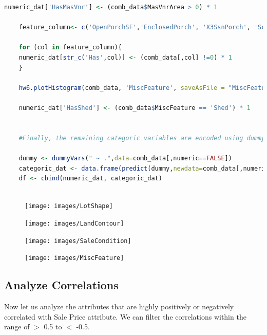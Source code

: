 \documentclass[sigconf]{acmart}
\begin{document}
\begin{lstlisting}[language=R]
	numeric_dat['HasMasVnr'] <- (comb_data$MasVnrArea > 0) * 1
	
	feature_column<- c('OpenPorchSF','EnclosedPorch', 'X3SsnPorch', 'ScreenPorch')
	
	for (col in feature_column){
	numeric_dat[str_c('Has',col)] <- (comb_data[,col] !=0) * 1
	}
	
	hw6.plotHistogram(comb_data, 'MiscFeature', saveAsFile = "MiscFeature")
	
	numeric_dat['HasShed'] <- (comb_data$MiscFeature == 'Shed') * 1
	
	
	#Finally, the remaining categoric variables are encoded using dummy variable function in the caret package.
	
	dummy <- dummyVars(" ~ .",data=comb_data[,numeric==FALSE])
	categoric_dat <- data.frame(predict(dummy,newdata=comb_data[,numeric==FALSE]))
	df <- cbind(numeric_dat, categoric_dat)
	
	\end{lstlisting}
	
	\begin{center}
		
		\begin{figure}
			\begin{minipage}[t]{0.45\linewidth}
				\texttt{[image: images/LotShape]}		
			\end{minipage}%
			\hfill%
			\begin{minipage}[t]{0.45\linewidth}
				\texttt{[image: images/LandContour]}			
			\end{minipage} 
		\end{figure}
		
		
		\begin{figure}
			\begin{minipage}[t]{0.45\linewidth}
				\texttt{[image: images/SaleCondition]}		
			\end{minipage}%
			\hfill%
			\begin{minipage}[t]{0.45\linewidth}
				\texttt{[image: images/MiscFeature]}			
			\end{minipage} 
		\end{figure}	
		
	\end{center}
	
	
	\subsection{Analyze Correlations}
	
	Now let us analyze the attributes that are highly positively or negatively correlated with Sale Price attribute. We can filter the correlations within the range of $>$ 0.5 to $<$ -0.5. 	
	
\end{document}
